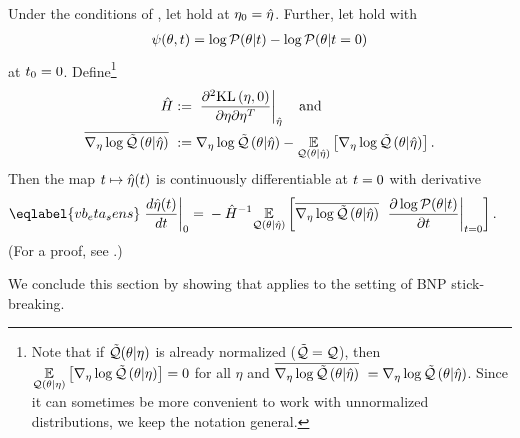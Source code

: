 \begin{thm}
%
Under the conditions of , let  hold at
$\eta_0 = \hat\eta$.  Further, let  hold with
%
\begin{align*}
%
\psi(\theta, \t) = \log \p(\theta \vert \t) - \log \p(\theta \vert \t=0)
%
\end{align*}
%
at $t_0 = 0$.
%
Define\footnote{Note that if $\tilde{\mathcal{Q}}(\theta \vert \eta)$ is already normalized
($\tilde{\mathcal{Q}} = \mathcal{Q}$), then $\underset{\mathcal{Q}(\theta \vert \eta)}{\mathbb{E}}\left[{\nabla_\eta \log \tilde{\mathcal{Q}}}\left(\theta \vert \eta\right)\right] =
0$ for all $\eta$ and $\overline{{\nabla_\eta \log \tilde{\mathcal{Q}}}\left(\theta \vert \hat\eta\right)}\,\, = {\nabla_\eta \log \tilde{\mathcal{Q}}}\left(\theta \vert
\hat\eta\right)$. Since it can sometimes be more convenient to work with unnormalized
distributions, we keep the notation general.}
%
\begin{align*}
%
\hessopt :={}& \fracat{\partial^2 \KL{\eta, 0}}
                {\partial \eta \partial \eta^T}
                {\etaopt} \mathand \\
\lqgradbar{\theta \vert \etaopt} :={}&
    \lqgrad{\theta \vert \etaopt} -
    \expect{\q(\theta \vert \etaopt)}{\lqgrad{\theta \vert \etaopt}}.
%
\end{align*}
%
Then the map $t \mapsto \hat\eta(t)$ is continuously differentiable at $t=0$
with derivative
%
\begin{align}\eqlabel{vb_eta_sens}
%
\fracat{d \etaopt(\t)}{d \t}{0} ={}&
    - \hessopt^{-1}
    \expect{\q(\theta \vert \etaopt)}{
        \lqgradbar{\theta \vert \etaopt}
        \fracat{\partial \log \p(\theta \vert \t)}{\partial \t}{\t=0}
    }.
%
\end{align}
%
(For a proof, see  .)
%
\end{thm}

We conclude this section by showing that  applies to the
setting of BNP stick-breaking.

